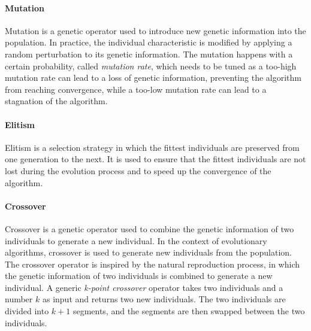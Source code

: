 \paragraph{Mutation}

Mutation is a genetic operator used to introduce new genetic information into the population. In practice, the individual characteristic is modified by applying a random perturbation to its genetic information. The mutation happens with a certain probability, called \textit{mutation rate}, which needs to be tuned as a too-high mutation rate can lead to a loss of genetic information, preventing the algorithm from reaching convergence, while a too-low mutation rate can lead to a stagnation of the algorithm.

\paragraph{Elitism}

Elitism is a selection strategy in which the fittest individuals are preserved from one generation to the next. It is used to ensure that the fittest individuals are not lost during the evolution process and to speed up the convergence of the algorithm.

\paragraph{Crossover}

Crossover is a genetic operator used to combine the genetic information of two individuals to generate a new individual. In the context of evolutionary algorithms, crossover is used to generate new individuals from the population. The crossover operator is inspired by the natural reproduction process, in which the genetic information of two individuals is combined to generate a new individual. A generic \textit{k-point crossover} operator takes two individuals and a number $k$ as input and returns two new individuals. The two individuals are divided into $k+1$ segments, and the segments are then swapped between the two individuals.